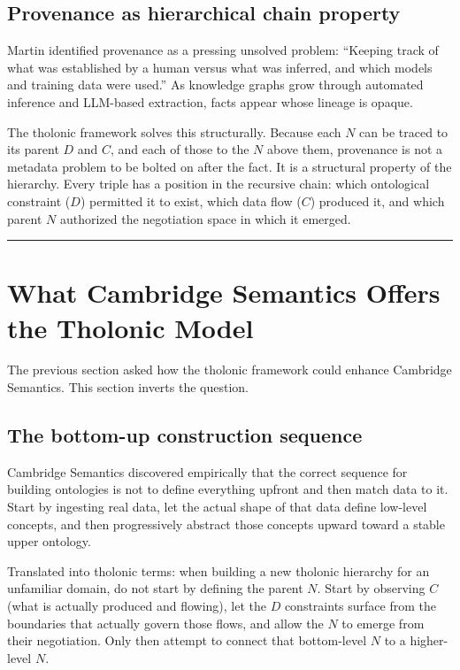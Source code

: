 \documentclass[12pt]{article}
\begin{document}
\subsection{Provenance as hierarchical chain property}\label{provenance-as-hierarchical-chain-property}

Martin identified provenance as a pressing unsolved problem: ``Keeping
track of what was established by a human versus what was inferred, and
which models and training data were used.'' As knowledge graphs grow
through automated inference and LLM-based extraction, facts appear whose
lineage is opaque.

The tholonic framework solves this structurally. Because each \(N\) can
be traced to its parent \(D\) and \(C\), and each of those to the \(N\)
above them, provenance is not a metadata problem to be bolted on after
the fact. It is a structural property of the hierarchy. Every triple has
a position in the recursive chain: which ontological constraint (\(D\))
permitted it to exist, which data flow (\(C\)) produced it, and which
parent \(N\) authorized the negotiation space in which it emerged.

\begin{center}\rule{0.5\linewidth}{0.5pt}\end{center}

\section{What Cambridge Semantics Offers the Tholonic Model}\label{what-cambridge-semantics-offers-the-tholonic-model}

The previous section asked how the tholonic framework could enhance
Cambridge Semantics. This section inverts the question.

\subsection{The bottom-up construction sequence}\label{the-bottom-up-construction-sequence}

Cambridge Semantics discovered empirically that the correct sequence for
building ontologies is not to define everything upfront and then match
data to it. Start by ingesting real data, let the actual shape of that
data define low-level concepts, and then progressively abstract those
concepts upward toward a stable upper ontology.

Translated into tholonic terms: when building a new tholonic hierarchy
for an unfamiliar domain, do not start by defining the parent \(N\).
Start by observing \(C\) (what is actually produced and flowing), let
the \(D\) constraints surface from the boundaries that actually govern
those flows, and allow the \(N\) to emerge from their negotiation. Only
then attempt to connect that bottom-level \(N\) to a higher-level \(N\).
\end{document}

